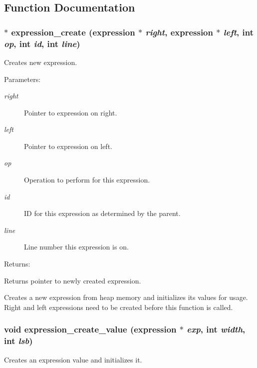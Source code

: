 \subsection{Function Documentation}
\subsubsection{$\ast$ expression\_\-create ({\bf expression} $\ast$ {\em right}, {\bf expression} $\ast$ {\em left}, int {\em op}, int {\em id}, int {\em line})}\label{expr_8c_a7}


Creates new expression.

\begin{Desc}
\item[Parameters: ]\par
\begin{description}
\item[{\em 
right}]Pointer to expression on right. \item[{\em 
left}]Pointer to expression on left. \item[{\em 
op}]Operation to perform for this expression. \item[{\em 
id}]ID for this expression as determined by the parent. \item[{\em 
line}]Line number this expression is on.\end{description}
\end{Desc}
\begin{Desc}
\item[Returns: ]\par
Returns pointer to newly created expression.\end{Desc}
Creates a new expression from heap memory and initializes its values for usage. Right and left expressions need to be created before this function is called. 
\subsubsection{\setlength{\rightskip}{0pt plus 5cm}void expression\_\-create\_\-value ({\bf expression} $\ast$ {\em exp}, int {\em width}, int {\em lsb})}\label{expr_8c_a6}


Creates an expression value and initializes it.

